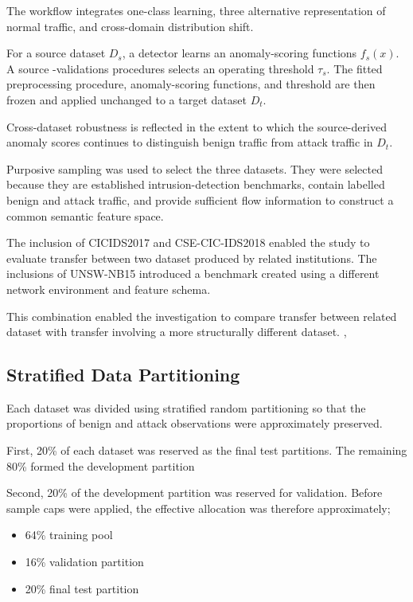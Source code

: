  The workflow integrates one-class learning, three alternative representation of normal traffic, and cross-domain distribution shift.
 
 For a source dataset \(D_s\), a detector learns an anomaly-scoring functions \(f_s(x)\). A source -validations procedures selects an operating threshold \(\tau_s\). The fitted preprocessing procedure, anomaly-scoring functions, and threshold are then frozen and applied unchanged to a target dataset \(D_t\).

Cross-dataset robustness is reflected in the extent to which the source-derived anomaly scores continues to distinguish benign traffic from attack traffic in \(D_t\).

Purposive sampling was used to select the three datasets. They were selected because they are established intrusion-detection benchmarks, contain labelled benign and attack traffic, and provide sufficient flow information to construct a common semantic feature space.

The inclusion of CICIDS2017 and CSE-CIC-IDS2018 enabled the study to evaluate transfer between two dataset produced by related institutions. The inclusions of UNSW-NB15 introduced a benchmark created using a different network environment and feature schema.

This combination enabled the investigation to compare transfer between related dataset with transfer involving a more structurally different dataset.
 \cite {Ring2019,Thakkar2020,Kenyon2020},
 
 \subsection {Stratified Data Partitioning}
 
 Each dataset was divided using stratified random partitioning so that the proportions of benign and attack observations were approximately preserved.
 
 First, 20\% of each dataset was reserved as the final test partitions. The remaining 80\% formed the development partition 
 
 Second, 20\% of the development partition was reserved for validation. Before sample caps were applied, the effective allocation was therefore approximately;
 
\begin{itemize}
        \item 64\% training pool
        \item 16\% validation partition
        \item 20\% final test partition
\end{itemize}
 
